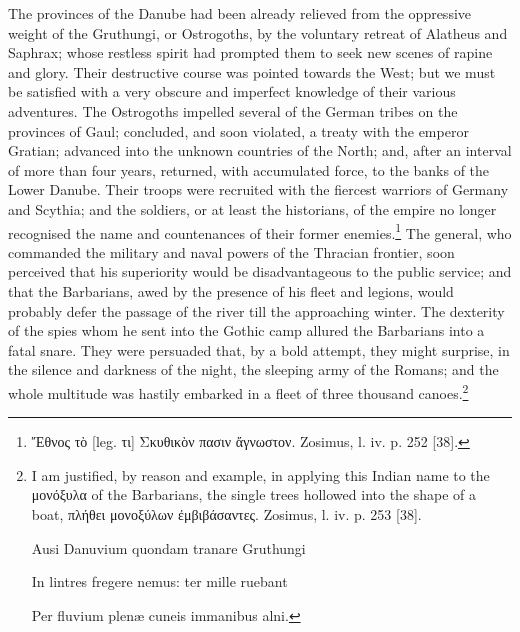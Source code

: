 The provinces of the Danube had been already relieved from the oppressive weight of the Gruthungi, or Ostrogoths, by the voluntary retreat of Alatheus and Saphrax; whose restless spirit had prompted them to seek new scenes of rapine and glory. Their destructive course was pointed towards the West; but we must be satisfied with a very obscure and imperfect knowledge of their various adventures. The Ostrogoths impelled several of the German tribes on the provinces of Gaul; concluded, and soon violated, a treaty with the emperor Gratian; advanced into the unknown countries of the North; and, after an interval of more than four years, returned, with accumulated force, to the banks of the Lower Danube. Their troops were recruited with the fiercest warriors of Germany and Scythia; and the soldiers, or at least the historians, of the empire no longer recognised the name and countenances of their former enemies.\footnote{\textgreek{\texthebrew{Ἔ}θνος τ\texthebrew{ὸ}} [leg. \textgreek{τι}] \textgreek{Σκυθικ\texthebrew{ὸ}ν πασιν \texthebrew{ἄ}γνωστον}. Zosimus, l. iv. p. 252 [38].} The general, who commanded the military and naval powers of the Thracian frontier, soon perceived that his superiority would be disadvantageous to the public service; and that the Barbarians, awed by the presence of his fleet and legions, would probably defer the passage of the river till the approaching winter. The dexterity of the spies whom he sent into the Gothic camp allured the Barbarians into a fatal snare. They were persuaded that, by a bold attempt, they might surprise, in the silence and darkness of the night, the sleeping army of the Romans; and the whole multitude was hastily embarked in a fleet of three thousand canoes.\footnote{I am justified, by reason and example, in applying this Indian name to the \textgreek{μονόξυλα} of the Barbarians, the single trees hollowed into the shape of a boat, \textgreek{πλήθει μονοξύλων \texthebrew{ἐ}μβιβάσαντες}. Zosimus, l. iv. p. 253 [38].

Ausi Danuvium quondam tranare Gruthungi

In lintres fregere nemus: ter mille ruebant

Per fluvium plenæ cuneis immanibus alni.

}
